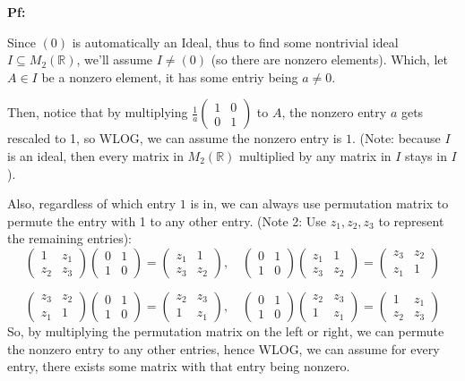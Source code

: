 \documentclass{article}
\begin{document}
\textbf{Pf:}

Since $(0)$ is automatically an Ideal, thus to find some nontrivial ideal $I\subseteq M_2(\mathbb{R})$, we'll assume $I\neq (0)$ (so there are nonzero elements).
Which, let $A\in I$ be a nonzero element, it has some entriy being $a\neq 0$. 

\hfill

Then, notice that by multiplying $\frac{1}{a}\begin{pmatrix}
    1&0\\0&1
\end{pmatrix}$ to $A$, the nonzero entry $a$ gets rescaled to 1, so WLOG, we can assume the nonzero entry is $1$. (Note: because $I$ is an ideal, then every matrix in $M_2(\mathbb{R})$ multiplied by any matrix in $I$ stays in $I$).

Also, regardless of which entry $1$ is in, we can always use permutation matrix to permute the entry with 1 to any other entry. (Note 2: Use $z_1,z_2,z_3$ to represent the remaining entries):
$$\begin{pmatrix}
    1& z_1\\z_2&z_3
\end{pmatrix}\begin{pmatrix}
    0&1\\1&0
\end{pmatrix}=\begin{pmatrix}
    z_1&1\\z_3&z_2
\end{pmatrix},\quad \begin{pmatrix}
    0&1\\1&0
\end{pmatrix}\begin{pmatrix}
    z_1&1\\z_3&z_2
\end{pmatrix}=\begin{pmatrix}
    z_3&z_2\\
    z_1&1
\end{pmatrix}$$

$$\begin{pmatrix}
    z_3&z_2\\
    z_1&1
\end{pmatrix}\begin{pmatrix}
    0&1\\1&0
\end{pmatrix}=\begin{pmatrix}
    z_2&z_3\\
    1&z_1
\end{pmatrix},\quad \begin{pmatrix}
    0&1\\1&0
\end{pmatrix}\begin{pmatrix}
    z_2&z_3\\
    1&z_1
\end{pmatrix}=\begin{pmatrix}
    1&z_1\\
    z_2&z_3
\end{pmatrix}$$
So, by multiplying the permutation matrix on the left or right, we can permute the nonzero entry to any other entries,
hence WLOG, we can assume for every entry, there exists some matrix with that entry being nonzero.
\end{document}
